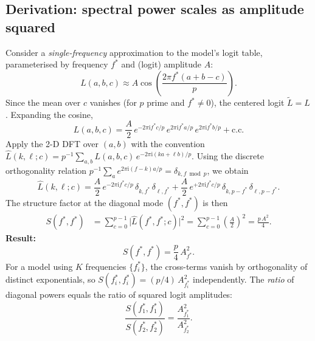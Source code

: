 \documentclass[11pt]{article}
\newcommand{\ii}{\mathrm{i}}
\begin{document}
\subsection{Derivation: spectral power scales as amplitude squared}
\label{sec:amp2}

Consider a \emph{single-frequency} approximation to the model's logit table,
parameterised by frequency $f^*$ and (logit) amplitude $A$:
\begin{equation}
    L(a,b,c) \approx A\cos\!\left(\frac{2\pi f^*(a+b-c)}{p}\right).
    \label{eq:single-freq-logit}
\end{equation}
Since the mean over $c$ vanishes (for $p$ prime and $f^*\neq 0$), the
centered logit $\tilde{L}=L$.  Expanding the cosine,
\begin{equation}
    L(a,b,c)
    = \frac{A}{2}\,e^{-2\pi\ii f^* c/p}\,
         e^{2\pi\ii f^* a/p}\,e^{2\pi\ii f^* b/p}
    + \mathrm{c.c.}
\end{equation}
Apply the 2-D DFT over $(a,b)$ with the convention
$\widehat{L}(k,\ell;c) = p^{-1}\sum_{a,b}L(a,b,c)\,
e^{-2\pi\ii(ka+\ell b)/p}$.
Using the discrete orthogonality relation
$p^{-1}\sum_{a}e^{2\pi\ii(f-k)a/p} = \delta_{k,f\bmod p}$, we obtain
\begin{equation}
    \widehat{L}(k,\ell;c)
    = \frac{A}{2}\,e^{-2\pi\ii f^* c/p}\,\delta_{k,f^*}\,\delta_{\ell,f^*}
    + \frac{A}{2}\,e^{+2\pi\ii f^* c/p}\,\delta_{k,p-f^*}\,\delta_{\ell,p-f^*}.
\end{equation}
The structure factor at the diagonal mode $(f^*,f^*)$ is then
\begin{align}
    S(f^*,f^*)
    &= \sum_{c=0}^{p-1}\bigl|\widehat{L}(f^*,f^*;c)\bigr|^2
     = \sum_{c=0}^{p-1}\left(\frac{A}{2}\right)^{\!2}
     = \frac{p\,A^2}{4}.
    \label{eq:Sff}
\end{align}
\textbf{Result:}
\begin{equation}
    \boxed{S(f^*,f^*) = \frac{p}{4}\,A_{f^*}^2.}
    \label{eq:Sscales}
\end{equation}
For a model using $K$ frequencies $\{f^*_i\}$, the cross-terms vanish by
orthogonality of distinct exponentials, so
$S(f^*_i,f^*_i) = (p/4)\,A_{f^*_i}^2$ independently.
The \emph{ratio} of diagonal powers equals the ratio of squared logit
amplitudes:
\begin{equation}
    \frac{S(f^*_1,f^*_1)}{S(f^*_2,f^*_2)} = \frac{A_{f^*_1}^2}{A_{f^*_2}^2}.
\end{equation}
\end{document}
